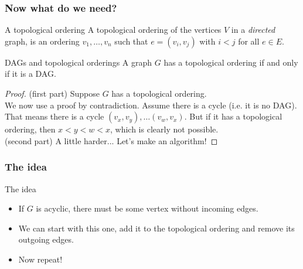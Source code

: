 \begin{frame}
	\frametitle{Now what do we need?}
	
		\begin{block}{A topological ordering}
			A topological ordering of the vertices $V$ in a \textit{directed} graph, is an ordering $v_1, \dots, v_n$ such
			that $e=(v_i,v_j)$ with $i < j$ for all $e \in E$.
		\end{block}	

		\pause
		\begin{block}{DAGs and topological orderings}
			A graph $G$ has a topological ordering if and only if it is a DAG.
		\end{block}	
		\pause
		\begin{proof}
			(first part) Suppose $G$ has a topological ordering.\\
			\pause
			We now use a proof by contradiction. Assume there is a cycle (i.e. it is no DAG). That means there is a cycle
			$(v_x, v_y), \dots (v_w, v_x)$. But if it has a topological ordering, then $x < y < w < x$, which is clearly not
			possible.\\
			\pause
			(second part) A little harder... Let's make an algorithm!
		\end{proof}
\end{frame}

\begin{frame}
	\frametitle{The idea}
	\begin{overlayarea}{\textwidth}{\textheight}
		\begin{block}{The idea}
			\begin{itemize}
				\item 
					If $G$ is acyclic, there must be some vertex without incoming edges.\\
				\item<3->
					We can start with this one, add it to the topological ordering and remove its outgoing edges.\\
				\item<4->
					Now repeat!
			\end{itemize}
		\end{block}	
	\end{overlayarea}
\end{frame}

